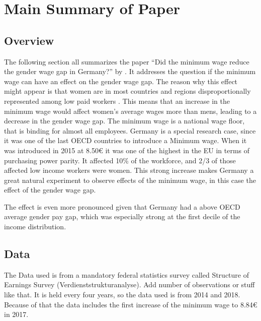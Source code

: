 \documentclass[12pt,draft,a4paper]{article}
\begin{document}
\section{Main Summary of Paper}
\subsection{Overview} \label{overview}

The following section all summarizes the paper “Did the minimum wage reduce the gender wage gap in Germany?” by \citet{CALIENDO22}. It addresses the question if the minimum wage can have an effect on the gender wage gap. 
The reason why this effect might appear is that women are in most countries and regions disproportionally represented among low paid workers \citep{kahn2015wage}.
This means that an increase in the minimum wage would affect women's average wages more than mens, leading to a decrease in the gender wage gap.
The minimum wage is a national wage floor, that is binding for almost all employees. Germany is a special research case, since it was one of the last OECD countries to introduce a Minimum wage. 
When it was introduced in 2015 at 8.50€ it was one of the highest in the EU in terms of purchasing power parity. It affected 10\% of the workforce, and 2/3 of those affected low income workers were women.  
This strong increase makes Germany a great natural experiment to observe effects of the minimum wage, in this case the effect of the gender wage gap. 

The effect is even more pronounced given that Germany had a above OECD average gender pay gap, which was especially strong at the first decile of the income distribution. 
\subsection{Data}
The Data used is from a mandatory federal statistics survey called Structure of Earnings Survey (Verdienststrukturanalyse). 
Add number of observations or stuff like that.
It is held every four years, so the data used is from 2014 and 2018. Because of that the data includes the first increase of the minimum wage to 8.84€ in 2017.

\end{document}
